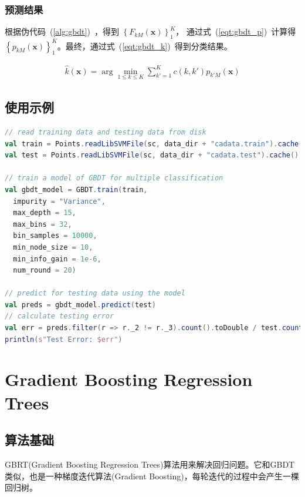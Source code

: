\documentclass[a4paper,11pt,         %
               ]{article}
\begin{document}
\subsubsection{预测结果}

根据伪代码~(\ref{alg:gbdt})~，得到 $\left \{ F_{kM}\left ( \mathbf{x} \right ) \right \}_{1}^{K}$， 通过式~(\ref{eqt:gbdt_p})~计算得 $\left \{ p_{kM}\left ( \mathbf{x} \right ) \right \}_{1}^{K}$。最终，通过式~(\ref{eqt:gbdt_k})~得到分类结果。

\begin{eqnarray}
  \label{eqt:gbdt_k}
  \hat{k}\left ( \mathbf{x} \right ) = \arg \min_{1\leqslant k\leqslant K}\sum _{k'=1}^{K}{c\left ( k,k' \right )p_{k'M}\left ( \mathbf{x} \right )}
\end{eqnarray}

\subsection{使用示例}

\begin{lstlisting}[language={SCALA},title={RunGBDT.scala}]  
// read training data and testing data from disk
val train = Points.readLibSVMFile(sc, data_dir + "cadata.train").cache()
val test = Points.readLibSVMFile(sc, data_dir + "cadata.test").cache()

// train a model of GBDT for multiple classification
val gbdt_model = GBDT.train(train,
  impurity = "Variance",
  max_depth = 15,
  max_bins = 32,
  bin_samples = 10000,
  min_node_size = 10,
  min_info_gain = 1e-6,
  num_round = 20)

// predict for testing data using the model
val preds = gbdt_model.predict(test)
// calculate testing error
val err = preds.filter(r => r._2 != r._3).count().toDouble / test.count()
println(s"Test Error: $err")
\end{lstlisting}  

\section{Gradient Boosting Regression Trees}

\subsection{算法基础}

GBRT(Gradient Boosting Regression Trees)算法用来解决回归问题。它和GBDT类似，也是一种梯度迭代算法(Gradient Boosting)，每轮迭代的过程中会产生一棵回归树。
\end{document}
